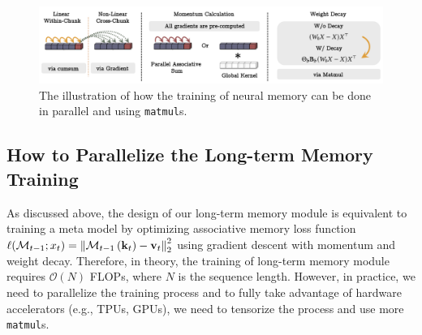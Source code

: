 \begin{figure}
    \centering
    \includegraphics[width=0.8\linewidth]{Figures/Parallelization.png}
    \caption{The illustration of how the training of neural memory can be done in parallel and using \texttt{matmul}s.}
    \label{fig:parallel}
\end{figure}

\subsection{How to Parallelize the Long-term Memory Training}\label{sec:fast-training} 
As discussed above, the design of our long-term memory module is equivalent to training a meta model by optimizing associative memory loss function $\ell(\mathcal{M}_{t-1}; x_t) =\left \Vert \mathcal{M}_{t-1}\left(\mathbf{k}_t\right) - \mathbf{v}_t  \right \Vert_2^2$ using gradient descent with momentum and weight decay. Therefore, in theory, the training of long-term memory module requires $\mathcal{O}\left(N\right)$ FLOPs, where $N$ is the sequence length. However, in practice, we need to parallelize the training process and to fully take advantage of hardware accelerators (e.g., TPUs, GPUs), we need to tensorize the process and use more \texttt{matmul}s. 

